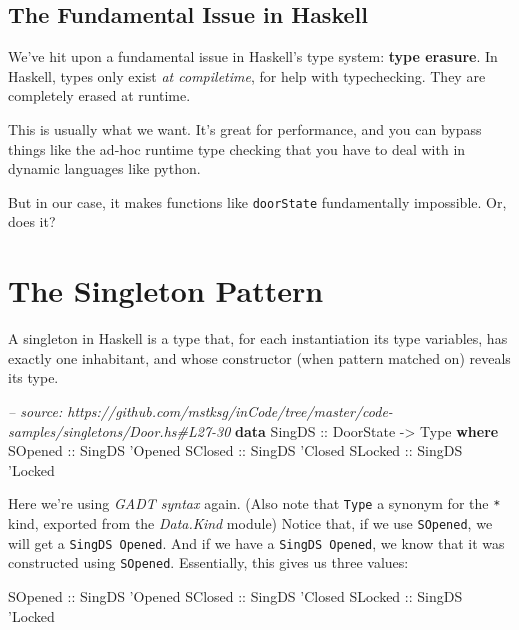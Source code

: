 \documentclass[]{article}
\newenvironment{Shaded}{}{}
\newcommand{\KeywordTok}[1]{\textcolor[rgb]{0.00,0.44,0.13}{\textbf{#1}}}
\newcommand{\DataTypeTok}[1]{\textcolor[rgb]{0.56,0.13,0.00}{#1}}
\newcommand{\CharTok}[1]{\textcolor[rgb]{0.25,0.44,0.63}{#1}}
\newcommand{\CommentTok}[1]{\textcolor[rgb]{0.38,0.63,0.69}{\textit{#1}}}
\newcommand{\OtherTok}[1]{\textcolor[rgb]{0.00,0.44,0.13}{#1}}
\begin{document}
\subsection{The Fundamental Issue in
Haskell}\label{the-fundamental-issue-in-haskell}

We've hit upon a fundamental issue in Haskell's type system: \textbf{type
erasure}. In Haskell, types only exist \emph{at compiletime}, for help with
typechecking. They are completely erased at runtime.

This is usually what we want. It's great for performance, and you can bypass
things like the ad-hoc runtime type checking that you have to deal with in
dynamic languages like python.

But in our case, it makes functions like \texttt{doorState} fundamentally
impossible. Or, does it?

\section{The Singleton Pattern}\label{the-singleton-pattern}

A singleton in Haskell is a type that, for each instantiation its type
variables, has exactly one inhabitant, and whose constructor (when pattern
matched on) reveals its type.

\begin{Shaded}
\begin{Highlighting}[]
\CommentTok{-- source: https://github.com/mstksg/inCode/tree/master/code-samples/singletons/Door.hs#L27-30}
\KeywordTok{data} \DataTypeTok{SingDS}\OtherTok{ ::} \DataTypeTok{DoorState} \OtherTok{->} \DataTypeTok{Type} \KeywordTok{where}
    \DataTypeTok{SOpened}\OtherTok{ ::} \DataTypeTok{SingDS} \CharTok{'Opened}
    \DataTypeTok{SClosed}\OtherTok{ ::} \DataTypeTok{SingDS} \CharTok{'Closed}
    \DataTypeTok{SLocked}\OtherTok{ ::} \DataTypeTok{SingDS} \CharTok{'Locked}
\end{Highlighting}
\end{Shaded}

Here we're using \emph{GADT syntax} again. (Also note that \texttt{Type} a
synonym for the \texttt{*} kind, exported from the \emph{Data.Kind} module)
Notice that, if we use \texttt{SOpened}, we will get a
\texttt{SingDS\ \textquotesingle{}Opened}. And if we have a
\texttt{SingDS\ \textquotesingle{}Opened}, we know that it was constructed using
\texttt{SOpened}. Essentially, this gives us three values:

\begin{Shaded}
\begin{Highlighting}[]
\DataTypeTok{SOpened}\OtherTok{ ::} \DataTypeTok{SingDS} \CharTok{'Opened}
\DataTypeTok{SClosed}\OtherTok{ ::} \DataTypeTok{SingDS} \CharTok{'Closed}
\DataTypeTok{SLocked}\OtherTok{ ::} \DataTypeTok{SingDS} \CharTok{'Locked}
\end{Highlighting}
\end{Shaded}
\end{document}
